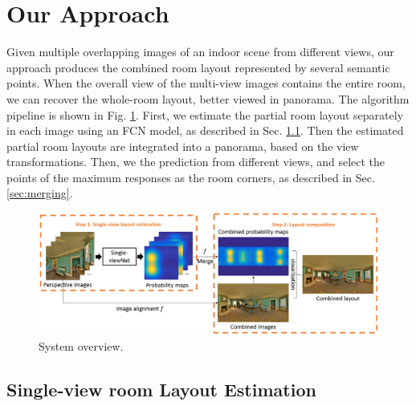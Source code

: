 \section{Our Approach}

Given multiple overlapping images of an indoor scene from different views, our approach produces the combined room layout represented by several semantic points. When the overall view of the multi-view images contains the entire room, we can recover the whole-room layout, better viewed in panorama. 
The algorithm pipeline is shown in Fig. \ref{fig:overview}. 
First, we estimate the partial room layout separately in each image using an FCN model, as described in Sec. \ref{sec:layout}. Then the estimated partial room layouts are integrated into a panorama, based on the view transformations. 
Then, we  the prediction from different views, and select the points of the maximum responses as the room corners, as described in Sec. \ref{sec:merging}. 


\begin{figure}[ht]
	\centering
	\includegraphics[width=\linewidth]{figs/ppline.png}
	\caption{System overview. }
	\label{fig:overview}
\end{figure}

\subsection{Single-view room Layout Estimation}
\label{sec:layout}

